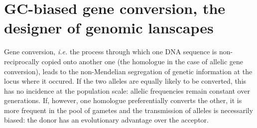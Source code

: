 \begin{savequote}[8cm]



\end{savequote}

\chapter{\label{ch:4-gBGC}GC-biased gene conversion, the designer of genomic lanscapes} 

\minitoc{}

%
%
%





Gene conversion, \textit{i.e.} the process through which one DNA sequence is non-reciprocally copied onto another one (the homologue in the case of allelic gene conversion), leads to the non-Mendelian segregation of genetic information at the locus where it occured. 
If the two alleles are equally likely to be converted, this has no incidence at the population scale: allelic frequencies remain constant over generations. 
If, however, one homologue preferentially converts the other, it is more frequent in the pool of gametes and the transmission of alleles is necessarily biased: the donor has an evolutionary advantage over the acceptor.


